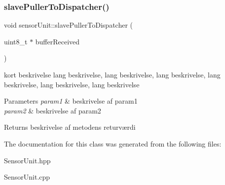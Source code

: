 \subsubsection{\texorpdfstring{slave\+Puller\+To\+Dispatcher()}{slavePullerToDispatcher()}}
{\footnotesize\ttfamily void sensor\+Unit\+::slave\+Puller\+To\+Dispatcher (\begin{DoxyParamCaption}\item[{uint8\+\_\+t $\ast$}]{buffer\+Received }\end{DoxyParamCaption})}



kort beskrivelse lang beskrivelse, lang beskrivelse, lang beskrivelse, lang beskrivelse, lang beskrivelse, lang beskrivelse 


\begin{DoxyParams}{Parameters}
{\em param1} & beskrivelse af param1 \\
\hline
{\em param2} & beskrivelse af param2 \\
\hline
\end{DoxyParams}
\begin{DoxyReturn}{Returns}
beskrivelse af metodens returværdi 
\end{DoxyReturn}


The documentation for this class was generated from the following files\+:\begin{DoxyCompactItemize}
\item 
Sensor\+Unit.\+hpp\item 
Sensor\+Unit.\+cpp\end{DoxyCompactItemize}
